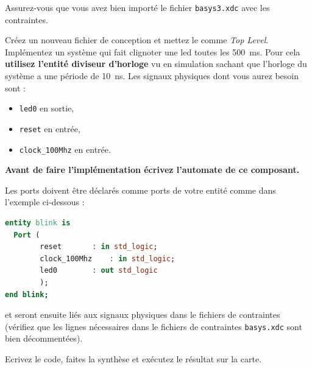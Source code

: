 \documentclass[11pt]{paper}
\begin{document}
Assurez-vous que vous avez bien importé le fichier {\tt basys3.xdc} avec les contraintes.

Créez un nouveau fichier de conception et mettez le comme {\it Top Level}. Implémentez un système qui fait clignoter une led toutes les 500~ms. Pour cela {\bf utilisez l'entité diviseur d'horloge} vu en simulation sachant que l'horloge du système a une période de 10~ns. Les signaux physiques dont vous aurez besoin sont :
\begin{itemize}
	\item {\tt led0} en sortie,
	\item {\tt reset} en entrée,
	\item {\tt clock\_100Mhz} en entrée.
\end{itemize}
\bigskip

{\bf Avant de faire l'implémentation écrivez l'automate de ce composant.}

Les ports doivent être déclarés comme ports de votre entité comme dans l'exemple ci-dessous :
\begin{lstlisting}[language=VHDL]
entity blink is
  Port (
        reset 		: in std_logic;
        clock_100Mhz 	: in std_logic;
        led0 		: out std_logic
        );
end blink;
\end{lstlisting}
et seront ensuite liés aux signaux physiques dans le fichiers de contraintes (vérifiez que les lignes nécessaires dans le fichiers de contraintes {\tt basys.xdc} sont bien décommentées).

Ecrivez le code, faites la synthèse et exécutez le résultat sur la carte.

\end{document}
